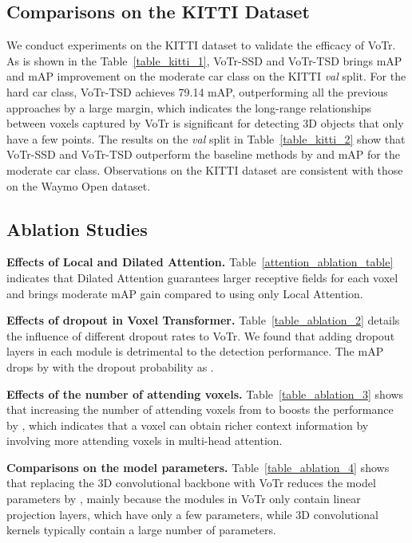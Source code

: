 \documentclass[10pt,twocolumn,letterpaper]{article}
\begin{document}
\subsection{Comparisons on the KITTI Dataset} \label{3D Detection on the KITTI Dataset} 
We conduct experiments on the KITTI dataset to validate the efficacy of VoTr. As is shown in the Table~\ref{table_kitti_1}, VoTr-SSD and VoTr-TSD brings  mAP and  mAP improvement on the moderate car class on the KITTI \textit{val} split. For the hard car class, VoTr-TSD achieves 79.14 mAP, outperforming all the previous approaches by a large margin, which indicates the long-range relationships between voxels captured by VoTr is significant for detecting 3D objects that only have a few points. The results on the \textit{val} split in Table~\ref{table_kitti_2} show that VoTr-SSD and VoTr-TSD outperform the baseline methods by  and  mAP for the moderate car class. Observations on the KITTI dataset are consistent with those on the Waymo Open dataset.


\subsection{Ablation Studies} \label{Ablation Studies}
\textbf{Effects of Local and Dilated Attention.} Table~\ref{attention_ablation_table} indicates that Dilated Attention guarantees larger receptive fields for each voxel and brings  moderate mAP gain compared to using only Local Attention.

\textbf{Effects of dropout in Voxel Transformer.} Table~\ref{table_ablation_2} details the influence of different dropout rates to VoTr. We found that adding dropout layers in each module is detrimental to the detection performance. The mAP drops by  with the dropout probability as . 


\textbf{Effects of the number of attending voxels.} Table~\ref{table_ablation_3} shows that increasing the number of attending voxels from  to  boosts the performance by , which indicates that a  voxel can obtain richer context information by involving more attending voxels in multi-head attention. 

\textbf{Comparisons on the model parameters.} Table~\ref{table_ablation_4} shows that replacing the 3D convolutional backbone with VoTr reduces the model parameters by , mainly because the modules in VoTr only contain linear projection layers, which have only a few parameters, while 3D convolutional kernels typically contain a large number of parameters. 
\end{document}
